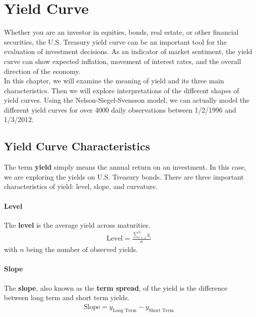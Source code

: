\documentclass[11pt]{report}
\begin{document}

\chapter{Yield Curve}

Whether you are an investor in equities, bonds, real estate, or other financial securities, the U.S. Treasury yield curve can be an important tool for the evaluation of investment decisions. As an indicator of market sentiment, the yield curve can show expected inflation, movement of interest rates, and the overall direction of the economy.\\


In this chapter, we will examine the meaning of yield and its three main characteristics. Then we will explore interpretations of the different shapes of yield curves. Using the Nelson-Siegel-Svensson model, we can actually model the different yield curves for over 4000 daily observations between 1/2/1996 and 1/3/2012.
 
\section{Yield Curve Characteristics}
The term \textbf{yield} simply means the annual return on an investment. In this case, we are exploring the yields on U.S. Treasury bonds. There are three important characteristics of yield: level, slope, and curvature.

\subsubsection{Level}

The \textbf{level} is the average yield across maturities.
\begin{align}
	\text{Level}=\frac{\sum_{i=1}^ny_i}{n}\label{yield_level}
\end{align}
with $n$ being the number of observed yields.

\subsubsection{Slope}

The \textbf{slope}, also known as the \textbf{term spread}, of the yield is the difference between long term and short term yields.
\begin{align}
	\text{Slope}=y_{\text{Long Term}} - y_{\text{Short Term}}\label{yield_slope}
\end{align}
\end{document}
